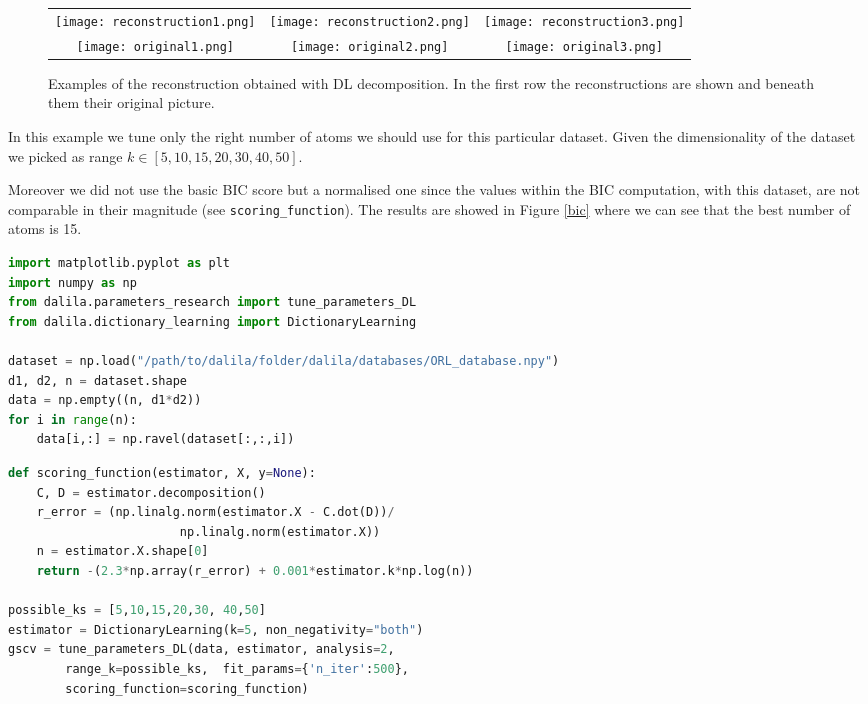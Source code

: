 \begin{figure}[H]
\centering
\begin{tabular}{ccc}
\texttt{[image: reconstruction1.png]} &
\texttt{[image: reconstruction2.png]} &
\texttt{[image: reconstruction3.png]}\\
\texttt{[image: original1.png]} &
\texttt{[image: original2.png]} &
\texttt{[image: original3.png]}\\
\end{tabular}
\caption{Examples of the reconstruction obtained with DL decomposition. In the first row the reconstructions are shown and beneath them their original picture.}
\label{reconstructions}
\end{figure}


In this example we tune only the right number of atoms we should use for this particular dataset. Given the dimensionality of the dataset we picked as range $k \in [5,10,15,20,30,40,50]$. 

Moreover we did not use the basic BIC score but a normalised one since the values within the BIC computation, with this dataset, are not comparable in their magnitude (see \texttt{scoring\_function}). The results are showed in Figure \ref{bic} where we can see that the best number of atoms is 15.
\begin{lstlisting}[language=Python]
import matplotlib.pyplot as plt
import numpy as np
from dalila.parameters_research import tune_parameters_DL
from dalila.dictionary_learning import DictionaryLearning

dataset = np.load("/path/to/dalila/folder/dalila/databases/ORL_database.npy")
d1, d2, n = dataset.shape
data = np.empty((n, d1*d2))
for i in range(n):
	data[i,:] = np.ravel(dataset[:,:,i])
\end{lstlisting}


\begin{lstlisting}[language=Python]
def scoring_function(estimator, X, y=None):
    C, D = estimator.decomposition()
    r_error = (np.linalg.norm(estimator.X - C.dot(D))/
    				 	np.linalg.norm(estimator.X))
    n = estimator.X.shape[0]
    return -(2.3*np.array(r_error) + 0.001*estimator.k*np.log(n))

possible_ks = [5,10,15,20,30, 40,50]
estimator = DictionaryLearning(k=5, non_negativity="both")
gscv = tune_parameters_DL(data, estimator, analysis=2, 
		range_k=possible_ks,  fit_params={'n_iter':500}, 			
		scoring_function=scoring_function)
\end{lstlisting}

